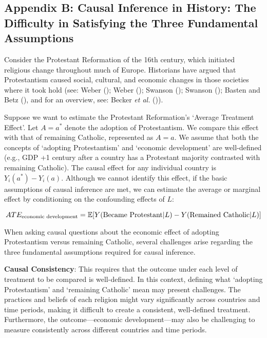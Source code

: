 \documentclass[
  single column]{article}
\begin{document}
\newpage{}

\subsection{Appendix B: Causal Inference in History: The Difficulty in
Satisfying the Three Fundamental Assumptions}\label{id-app-b}

Consider the Protestant Reformation of the 16th century, which initiated
religious change throughout much of Europe. Historians have argued that
Protestantism caused social, cultural, and economic changes in those
societies where it took hold (see: Weber
(); Weber
(); Swanson
(); Swanson
(); Basten and Betz
(), and for an overview, see: Becker
\emph{et al.} ()).

Suppose we want to estimate the Protestant Reformation's `Average
Treatment Effect'. Let \(A = a^*\) denote the adoption of Protestantism.
We compare this effect with that of remaining Catholic, represented as
\(A = a\). We assume that both the concepts of `adopting Protestantism'
and `economic development' are well-defined (e.g., GDP +1 century after
a country has a Protestant majority contrasted with remaining Catholic).
The causal effect for any individual country is \(Y_i(a^*) - Y_i(a)\).
Although we cannot identify this effect, if the basic assumptions of
causal inference are met, we can estimate the average or marginal effect
by conditioning on the confounding effects of \(L\):

\[
ATE_{\textnormal{economic~development}} = \mathbb{E}[Y(\textnormal{Became~Protestant}|L) - Y(\textnormal{Remained~Catholic}|L)]
\]

When asking causal questions about the economic effect of adopting
Protestantism versus remaining Catholic, several challenges arise
regarding the three fundamental assumptions required for causal
inference.

\textbf{Causal Consistency}: This requires that the outcome under each
level of treatment to be compared is well-defined. In this context,
defining what `adopting Protestantism' and `remaining Catholic' mean may
present challenges. The practices and beliefs of each religion might
vary significantly across countries and time periods, making it
difficult to create a consistent, well-defined treatment. Furthermore,
the outcome---economic development---may also be challenging to measure
consistently across different countries and time periods.
\end{document}
